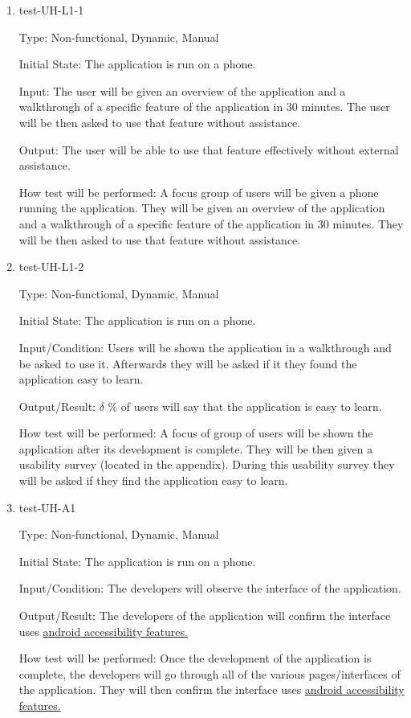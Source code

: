 \documentclass[12pt, titlepage]{article}
\begin{document}
\begin{enumerate}
\item{test-UH-L1-1\\}

Type: Non-functional, Dynamic, Manual
					
Initial State: The application is run on a phone.
					
Input: The user will be given an overview of the application and a walkthrough of a specific feature of the application in 30 minutes. The user will be then asked to use that feature without assistance.
					
Output: The user will be able to use that feature effectively without external assistance.
					
How test will be performed: A focus group of users will be given a phone running the application. They will be given an overview of the application and a walkthrough of a specific feature of the application in 30 minutes. They will be then asked to use that feature without assistance.

\item{test-UH-L1-2\\}

Type: Non-functional, Dynamic, Manual 
					
Initial State: The application is run on a phone.
					
Input/Condition: Users will be shown the application in a walkthrough and be asked to use it. Afterwards they will be asked if it they found the application easy to learn. 
					
Output/Result: $\delta$ \% of users will say that the application is easy to learn. 
					
How test will be performed: A focus of group of users will be shown the application after its development is complete. They will be then given a usability survey (located in the appendix). During this usability survey they will be asked if they find the application easy to learn.


\item{test-UH-A1\\}

Type: Non-functional, Dynamic, Manual 
					
Initial State: The application is run on a phone.
					
Input/Condition: The developers will observe the interface of the application. 
					
Output/Result: The developers of the application will confirm the interface uses \href{https://support.google.com/accessibility/android/answer/6006564?hl=en}{android accessibility features.}
					
How test will be performed: Once the development of the application is complete, the developers will go through all of the various pages/interfaces of the application. They will then confirm the interface uses \href{https://support.google.com/accessibility/android/answer/6006564?hl=en}{android accessibility features.}
					

\end{enumerate}
\end{document}
